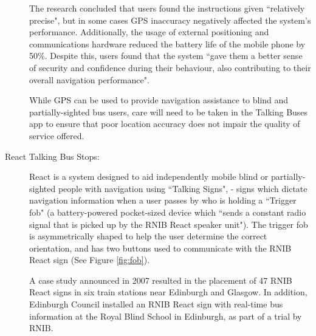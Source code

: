 \documentclass[10pt,twocolumn]{article}
\newcommand{\citep}[1]{}
\begin{document}
\begin{description}
The research concluded that users found the instructions given ``relatively precise"\citep{metrobus}, but in some cases GPS inaccuracy negatively affected the system's performance. Additionally, the usage of external positioning and communications hardware reduced the battery life of the mobile phone by 50\%. Despite this, users found that the system ``gave them a better sense of security and confidence during their behaviour, also contributing to their overall navigation performance".

While GPS can be used to provide navigation assistance to blind and partially-sighted bus users, care will need to be taken in the Talking Buses app to ensure that poor location accuracy does not impair the quality of service offered.

\item[React Talking Bus Stops:]
React is a system designed to aid independently mobile blind or partially-sighted people with navigation using ``Talking Signs",\citep{react} - signs which dictate navigation information when a user passes by who is holding a ``Trigger fob" (a battery-powered pocket-sized device which ``sends a constant radio signal that is picked up by the RNIB React speaker unit"\citep{reactEdinburgh}). The trigger fob is asymmetrically shaped to help the user determine the correct orientation, and has two buttons used to communicate with the RNIB React sign (See Figure \ref{fig:fob}).

A case study announced in 2007 resulted in the placement of 47 RNIB React signs in six train stations near Edinburgh and Glasgow\citep{scotrail}.  In addition, Edinburgh Council installed an RNIB React sign with real-time bus information at the Royal Blind School in Edinburgh, as part of a trial by RNIB\citep{royalBlindSchoolReact}.


\end{description}
\end{document}
